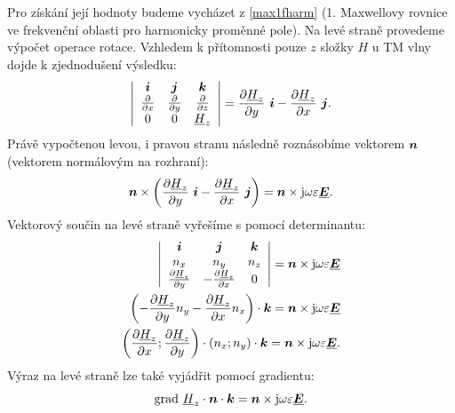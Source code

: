 \documentclass[12pt,a4paper,oneside]{article}
\numberwithin{equation}{section} %
\numberwithin{figure}{section} %
\numberwithin{table}{section} %
\newcommand{\mj}{\mathrm{j}} %
\renewcommand{\vec}[1]{\mbox{\boldmath$#1$}} %
\newcommand{\faz}[1]{{\underline{#1}}} %
\newcommand{\grad}{\mathrm{grad}\ }
\begin{document}
Pro získání její hodnoty budeme vycházet z \ref{max1fharm} (1. Maxwellovy rovnice ve frekvenční oblasti pro harmonicky proměnné pole). Na levé straně provedeme výpočet operace rotace. Vzhledem k přítomnosti pouze $z$ složky $H$ u TM vlny dojde k zjednodušení výsledku:
\begin{equation}
\left| 
\begin{array}{c c c}
\vec{i} & \vec{j} & \vec{k} \\ 
\frac{\partial}{\partial x} & \frac{\partial}{\partial y} & \frac{\partial}{\partial z} \\
0 & 0 & \faz{H}_z
\end{array}
\right|
= \frac{\partial \faz{H}_z}{\partial y} ~ \vec{i} - \frac{\partial \faz{H}_z}{\partial x} ~ \vec{j}  .
\end{equation} 
Právě vypočtenou levou, i pravou stranu následně roznásobíme vektorem $\vec{n}$ (vektorem normálovým na rozhraní):
\begin{equation}
\vec{n} \times \left( \frac{\partial \faz{H}_z}{\partial y} ~ \vec{i} - \frac{\partial \faz{H}_z}{\partial x} ~ \vec{j} \right) = \vec{n} \times \mj \omega \varepsilon \faz{\vec{E}} .
\end{equation}
Vektorový součin na levé straně vyřešíme s pomocí determinantu:
\begin{subequations}
\begin{align}
\left| 
\begin{array}{c c c}
\vec{i} & \vec{j} & \vec{k} \\ 
n_x & n_y & n_z \\
\frac{\partial \faz{H}_z}{\partial y} & - \frac{\partial \faz{H}_z}{\partial x} & 0
\end{array}
\right|
= \vec{n} \times \mj \omega \varepsilon \faz{\vec{E}} 
\\
\left( - \frac{\partial \faz{H}_z}{\partial y} n_y - \frac{\partial \faz{H}_z}{\partial x} n_x \right) \cdot \vec{k} = \vec{n} \times \mj \omega \varepsilon \faz{\vec{E}}
\\
\left( \frac{\partial \faz{H}_z}{\partial x} ; \frac{\partial \faz{H}_z}{\partial y} \right) \cdot \left( n_x; n_y \right) \cdot \vec{k} = \vec{n} \times \mj \omega \varepsilon \faz{\vec{E}} .
\end{align}
\end{subequations}
Výraz na levé straně lze také vyjádřit pomocí gradientu:
\begin{equation}
\grad \faz{H}_z \cdot \vec{n} \cdot \vec{k} = \vec{n} \times \mj \omega \varepsilon \faz{\vec{E}} .
\end{equation}
\end{document}

